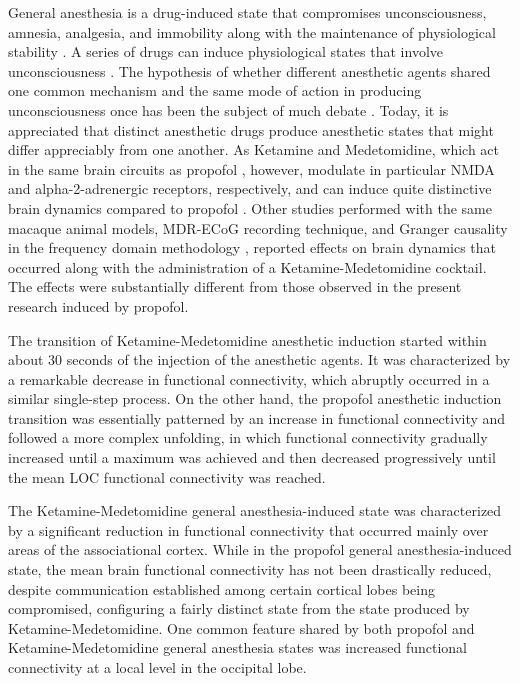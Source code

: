 \documentclass[twoside]{article}
\begin{document}
\begin{multicols}{2}
General anesthesia is a drug-induced state that compromises unconsciousness, amnesia, analgesia, and immobility along with the maintenance of physiological stability \citep{brown2010general,brown2011general}. A series of drugs can induce physiological states that involve unconsciousness \citep{franks2008general}. The hypothesis of whether different anesthetic agents shared one common mechanism and the same mode of action in producing unconsciousness once has been the subject of much debate \citep{angel1993central}. Today, it is appreciated that distinct anesthetic drugs produce anesthetic states that might differ appreciably from one another. As Ketamine and Medetomidine, which act in the same brain circuits as propofol \citep{ching2014modeling}, however, modulate in particular NMDA and alpha-2-adrenergic receptors, respectively, and can induce quite distinctive brain dynamics compared to propofol \citep{brown2010general,brown2011general}. Other studies performed with the same macaque animal models, MDR-ECoG recording technique, and Granger causality in the frequency domain methodology \citep{padovani2016characterization,padovani2016structure}, reported effects on brain dynamics that occurred along with the administration of a Ketamine-Medetomidine cocktail. The effects were substantially different from those observed in the present research induced by propofol.

 The transition of Ketamine-Medetomidine anesthetic induction started within about 30 seconds of the injection of the anesthetic agents. It was characterized by a remarkable decrease in functional connectivity, which abruptly occurred in a similar single-step process. On the other hand, the propofol anesthetic induction transition was essentially patterned by an increase in functional connectivity and followed a more complex unfolding, in which functional connectivity gradually increased until a maximum was achieved and then decreased progressively until the mean LOC functional connectivity was reached. 


The Ketamine-Medetomidine general anesthesia-induced state was characterized by a significant reduction in functional connectivity that occurred mainly over areas of the associational cortex. While in the propofol general anesthesia-induced state, the mean brain functional connectivity has not been drastically reduced, despite communication established among certain cortical lobes being compromised, configuring a fairly distinct state from the state produced by Ketamine-Medetomidine. One common feature shared by both propofol and Ketamine-Medetomidine general anesthesia states was increased functional connectivity at a local level in the occipital lobe. 



\end{multicols}
\end{document}
